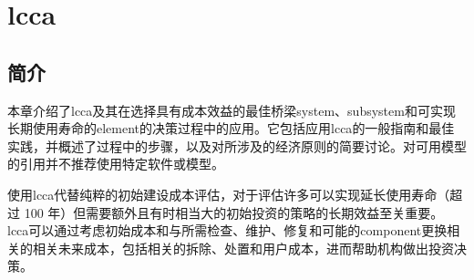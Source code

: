 \chapter[全生命周期成本分析]{\acrlong{lcca}}\label{chp:lcca}
\section{简介}
本章介绍了\acrfull{lcca}及其在选择具有成本效益的最佳桥梁\gls*{system}、\gls*{subsystem}和可实现长期使用寿命的\gls*{element}的决策过程中的应用。它包括应用\acrlong{lcca}的一般指南和最佳实践，并概述了过程中的步骤，以及对所涉及的经济原则的简要讨论。对可用模型的引用并不推荐使用特定软件或模型。


使用\acrlong*{lcca}代替纯粹的初始建设成本评估，对于评估许多可以实现延长使用寿命（超过 100 年）但需要额外且有时相当大的初始投资的策略的长期效益至关重要。 \acrlong*{lcca}可以通过考虑初始成本和与所需检查、维护、修复和可能的\gls*{component}更换相关的相关未来成本，包括相关的拆除、处置和用户成本，进而帮助机构做出投资决策。

